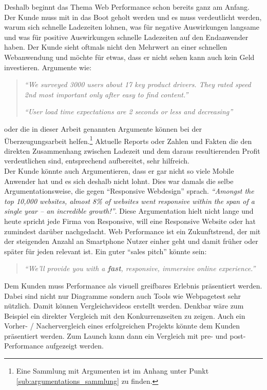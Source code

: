 	Deshalb beginnt das Thema Web Performance schon bereits ganz am Anfang. Der Kunde muss mit in das Boot geholt werden und es muss verdeutlicht werden, warum sich schnelle Ladezeiten lohnen, was für negative Auswirkungen langsame und was für positive Auswirkungen schnelle Ladezeiten auf den Endanwender haben. Der Kunde sieht oftmals nicht den Mehrwert an einer schnellen Webanwendung und möchte für etwas, dass er nicht sehen kann auch kein Geld investieren. Argumente wie:
	\begin{quote}
		\textit{"`We surveyed 3000 users about 17 key product drivers. They rated speed 2nd most important only after easy to find content."'} \autocite[p. 8]{hamann14}

		\textit{"`User load time expectations are 2 seconds or less and decreasing"'} \autocite{bixby13}
	\end{quote}
	oder die in dieser Arbeit genannten Argumente können bei der Überzeugungsarbeit helfen.\footnote{Eine Sammlung mit Argumenten ist im Anhang unter Punkt \ref{sub:argumentations_sammlung} zu finden.} Aktuelle Reports oder Zahlen und Fakten die den direkten Zusammenhang zwischen Ladezeit und dem daraus resultierenden Profit verdeutlichen sind, entsprechend aufbereitet, sehr hilfreich.\\
	Der Kunde könnte auch Argumentieren, dass er gar nicht so viele Mobile Anwender hat und es sich deshalb nicht lohnt. Dies war damals die selbe Argumentationsweise, die gegen "`Responsive Webdesign"' sprach. \textit{"`Amongst the top 10,000 websites, almost 8\% of websites went responsive within the span of a single year – an incredible growth!"'}\autocite{guypo14}. Diese Argumentation hielt nicht lange und heute spricht jede Firma von Responsive, will eine Responsive Website oder hat zumindest darüber nachgedacht.\autocite{guypo14} Web Performance ist ein Zukunftstrend, der mit der steigenden Anzahl an Smartphone Nutzer einher geht und damit früher oder später für jeden relevant ist. Ein guter "`sales pitch"' könnte sein:
	\begin{quote}
		 \textit{"`We'll provide you with a \textbf{fast}, responsive, immersive online experience."'}\autocite[p. 32]{kovalcin15}
	\end{quote}
	Dem Kunden muss Performance als visuell greifbares Erlebnis präsentiert werden. Dabei sind nicht nur Diagramme sondern auch Tools wie Webpagetest sehr nützlich. Damit können Vergleichsvideos erstellt werden. Denkbar wäre zum Beispiel ein direkter Vergleich mit den Konkurrenzseiten zu zeigen. Auch ein Vorher- / Nachervergleich eines erfolgreichen Projekts könnte dem Kunden präsentiert werden. Zum Launch kann dann ein Vergleich mit pre- und post-Performance aufgezeigt werden.\\

